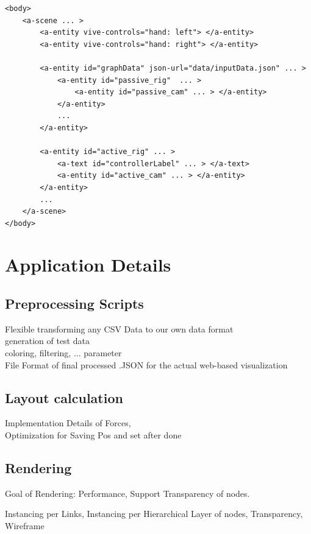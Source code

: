 \begin{lstlisting}[label={lst:virtualSceneGraph},caption=Simplified virtual A-Frame scene graph used by the application.]
<body>
    <a-scene ... >
        <a-entity vive-controls="hand: left"> </a-entity>
        <a-entity vive-controls="hand: right"> </a-entity>
        
        <a-entity id="graphData" json-url="data/inputData.json" ... >
            <a-entity id="passive_rig"  ... >  
                <a-entity id="passive_cam" ... > </a-entity>
            </a-entity>
            ...
        </a-entity>

        <a-entity id="active_rig" ... >
            <a-text id="controllerLabel" ... > </a-text>
            <a-entity id="active_cam" ... > </a-entity>
        </a-entity>
        ...
    </a-scene>
</body>
\end{lstlisting}

\section{Application Details}

\subsection{Preprocessing Scripts}
\label{sec:preprocessing}


Flexible transforming any CSV Data to our own data format \\
generation of test data \\
coloring, filtering, ... parameter \\
File Format of final processed .JSON for the actual web-based visualization \\

\subsection{Layout calculation}
\label{sec:layoutCalculation}
Implementation Details of Forces, \\
Optimization for Saving Pos and set after done

\subsection{Rendering}
\label{sec:rendering}
Goal of Rendering: 
Performance, Support Transparency of nodes. 

Instancing per Links, 
Instancing per Hierarchical Layer of nodes, 
Transparency,
Wireframe

